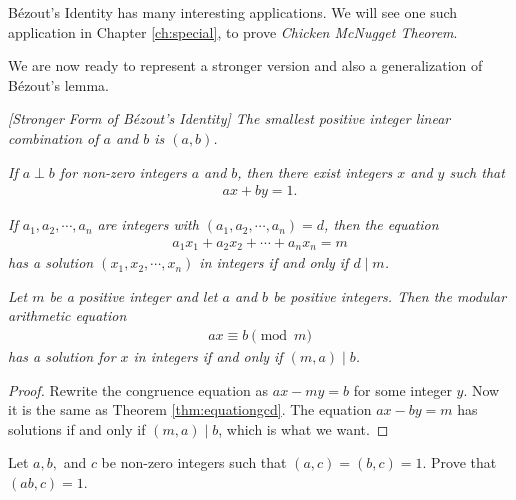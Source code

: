 \documentclass{subfile}
\begin{document}
	B\'{e}zout's Identity has many interesting applications. We will see one such application in Chapter \ref{ch:special}, to prove \textit{Chicken McNugget Theorem}. 
	
	We are now ready to represent a stronger version and also a generalization of B\'{e}zout's lemma.
	
	\begin{corollary} \slshape  [Stronger Form of B\'{e}zout's Identity]\label{cor:strongbezout}
		The smallest positive integer linear combination of $a$ and $b$ is $(a,b)$.
	\end{corollary}
	
	\begin{corollary} \slshape \label{cor:bezoutcoprime}
		If $a \perp b$ for non-zero integers $a$ and $b$, then there exist integers $x$ and $y$ such that
		\begin{align*}
		ax+by=1.
		\end{align*}
	\end{corollary}
	
	\begin{theorem}  \slshape 
		If $a_1, a_2, \cdots, a_n$ are integers with $(a_1, a_2, \cdots, a_n)=d$, then the equation
		\begin{align*}
		a_1x_1 + a_2x_2 + \cdots + a_n x_n = m
		\end{align*}
		has a solution $(x_1, x_2, \cdots, x_n)$ in integers if and only if $d\mid m$.
	\end{theorem}
	
	\begin{theorem}\slshape\label{thm:ax=b}
		Let $m$ be a positive integer and let $a$ and $b$ be positive integers. Then the modular arithmetic equation
		\begin{align*} ax \equiv b \pmod m\end{align*}
		has a solution for $x$ in integers if and only if $(m,a)\mid b$.
	\end{theorem}
	
	\begin{proof}
		Rewrite the congruence equation as $ax-my = b$ for some integer $y$. Now it is the same as Theorem \ref{thm:equationgcd}. The equation $ax-by=m$ has solutions if and only if $(m,a)\mid b$, which is what we want.
	\end{proof}
	
	\begin{problem}
		Let $a,b,$ and $c$ be non-zero integers such that $(a, c)=(b,c)=1$. Prove that $(ab,c)=1$.
	\end{problem}
	
\end{document}
